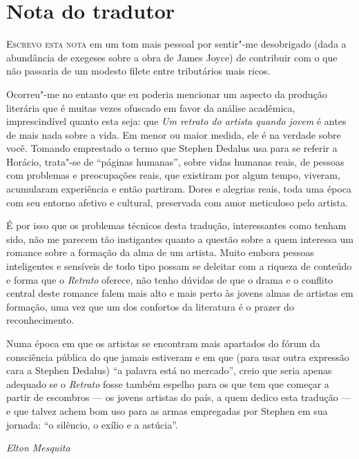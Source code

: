 \chapter[Nota do tradutor]{Nota do tradutor}

\vspace*{2em}

\noindent \textsc{Escrevo esta nota} em um tom mais pessoal por sentir"-me desobrigado 
(dada a abundância de exegeses sobre a obra de James Joyce) de contribuir 
com o que não passaria de um modesto filete entre tributários mais ricos.

Ocorreu"-me no entanto que eu poderia mencionar um aspecto da produção literária 
que é muitas vezes ofuscado em favor da análise acadêmica, imprescindível 
quanto esta seja: que \textit{Um retrato do artista quando jovem} é antes 
de mais nada sobre a vida.  Em menor ou maior medida, ele é na verdade sobre você. 
Tomando emprestado o termo que Stephen Dedalus usa 
para se referir a Horácio, trata"-se de ``páginas humanas'', sobre vidas 
humanas reais, de pessoas com problemas e preocupações reais, que existiram por algum tempo, viveram, acumularam experiência 
e então partiram. Dores e alegrias reais, toda uma época com seu 
entorno afetivo e cultural, preservada com amor meticuloso pelo artista.

É por isso que os problemas técnicos desta tradução, interessantes 
como tenham sido, não me parecem tão instigantes quanto a questão 
sobre a quem interessa um romance sobre a formação da alma de um artista. 
Muito embora pessoas inteligentes e sensíveis de todo tipo possam se deleitar com a riqueza de conteúdo e forma que o 
\textit{Retrato} oferece, não tenho dúvidas de que o drama e o conflito central 
deste romance falem mais alto e mais perto às jovens almas de artistas em formação, 
uma vez que um dos confortos da literatura é o prazer do reconhecimento.

Numa época em que os artistas se encontram mais apartados do fórum da 
consciência pública do que jamais estiveram e em que (para usar outra
expressão cara a Stephen Dedalus) ``a palavra está no mercado'', creio 
que seria apenas adequado se o \textit{Retrato} fosse também espelho para 
os que tem que começar a partir de escombros — os jovens artistas do 
país, a quem dedico esta tradução --- e que talvez achem bom uso para as 
armas empregadas por Stephen em sua jornada: ``o silêncio, o exílio e a astúcia''.

\thispagestyle{empty}

\medskip

\hfill\textit{Elton Mesquita}

